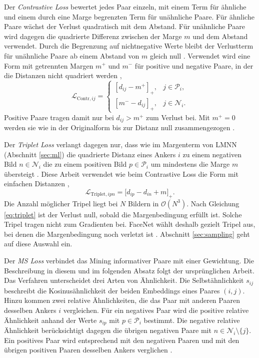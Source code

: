 Der \emph{Contrastive Loss} bewertet jedes Paar einzeln, mit einem Term für ähnliche und einem durch eine Marge begrenzten Term für unähnliche Paare. Für ähnliche Paare wächst der Verlust quadratisch mit dem Abstand. Für unähnliche Paare wird dagegen die quadrierte Differenz zwischen der Marge \(m\) und dem Abstand verwendet. Durch die Begrenzung auf nichtnegative Werte bleibt der Verlustterm für unähnliche Paare ab einem Abstand von $m$ gleich null \cite{hadsell_dimensionality_2006}. Verwendet wird eine Form mit getrennten Margen $m^{+}$ und $m^{-}$ für positive und negative Paare, in der die Distanzen nicht quadriert werden \cite{musgrave_metric_2020, hadsell_dimensionality_2006},
\begin{equation}
  \mathcal{L}_{\mathrm{Contr},ij}=\begin{cases}[d_{ij}-m^{+}]_{+}, & j\in\mathcal{P}_i,\\ [m^{-}-d_{ij}]_{+}, & j\in\mathcal{N}_i.\end{cases}
  \label{eq:contrastive}
\end{equation}
Positive Paare tragen damit nur bei $d_{ij}>m^{+}$ zum Verlust bei. Mit $m^{+}=0$ werden sie wie in der Originalform bis zur Distanz null zusammengezogen \cite{musgrave_metric_2020}.

Der \emph{Triplet Loss} verlangt dagegen nur, dass wie im Margenterm von \ac{LMNN} (Abschnitt \ref{sec:ml}) die quadrierte Distanz eines Ankers $i$ zu einem negativen Bild $n\in\mathcal{N}_i$ die zu einem positiven Bild $p\in\mathcal{P}_i$ um mindestens die Marge $m$ übersteigt \cite{schroff_facenet_2015}. Diese Arbeit verwendet wie beim Contrastive Loss die Form mit einfachen Distanzen \cite{musgrave_metric_2020, schroff_facenet_2015},
\begin{equation}
  \mathcal{L}_{\mathrm{Triplet},ipn}=\bigl[d_{ip}-d_{in}+m\bigr]_{+}.
  \label{eq:triplet}
\end{equation}
Die Anzahl möglicher Tripel liegt bei $N$ Bildern in
$\mathcal{O}(N^3)$. Nach Gleichung \eqref{eq:triplet} ist der Verlust null, sobald die Margenbedingung erfüllt ist. Solche Tripel tragen nicht zum Gradienten bei. FaceNet wählt deshalb gezielt Tripel aus, bei denen die Margenbedingung noch verletzt ist \cite{schroff_facenet_2015}. Abschnitt \ref{sec:sampling} geht auf diese Auswahl ein.

Der \emph{\acl{MS} Loss} verbindet das Mining informativer Paare mit einer Gewichtung. Die Beschreibung in diesem und im folgenden Absatz folgt der ursprünglichen Arbeit. Das Verfahren unterscheidet drei Arten von Ähnlichkeit. Die Selbstähnlichkeit $s_{ij}$ beschreibt die Kosinusähnlichkeit der beiden Embeddings eines Paares $(i,j)$. Hinzu kommen zwei relative Ähnlichkeiten, die das Paar mit anderen Paaren desselben Ankers $i$ vergleichen. Für ein negatives Paar wird die positive relative Ähnlichkeit anhand der Werte $s_{ip}$ mit $p\in\mathcal{P}_i$ bestimmt. Die negative relative Ähnlichkeit berücksichtigt dagegen die übrigen negativen Paare mit $n\in\mathcal{N}_i\setminus\{j\}$. Ein positives Paar wird entsprechend mit den negativen Paaren und mit den übrigen positiven Paaren desselben Ankers verglichen \cite{wang_multi-similarity_2019}. 


